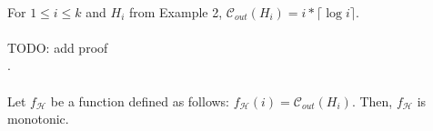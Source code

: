 \documentclass[12pt,oneside,a4paper]{book}
\begin{document}
\paragraph{}
\clema For $1 \leq i \leq k$ and $H_i$ from Example 2, $\mathscr{C}_{out}(H_i) = i*\lceil \log i \rceil$.

\paragraph{}
\dokaz

\color{red}TODO: add proof\color{black}\\
\square.

\paragraph{}
\cdosledok Let $f_{\mathcal{H}}$ be a function defined as follows: $f_{\mathcal{H}}(i) = \mathscr{C}_{out}(H_i)$. Then, $f_{\mathcal{H}}$ is monotonic.

\paragraph{}
\end{document}
